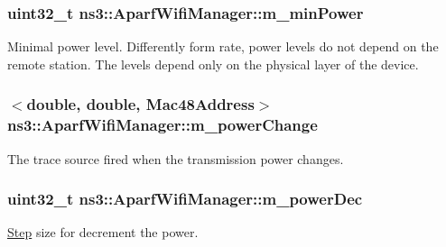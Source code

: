 \subsubsection[{\texorpdfstring{m\+\_\+min\+Power}{m_minPower}}]{\setlength{\rightskip}{0pt plus 5cm}uint32\+\_\+t ns3\+::\+Aparf\+Wifi\+Manager\+::m\+\_\+min\+Power\hspace{0.3cm}{\ttfamily [private]}}\hypertarget{classns3_1_1AparfWifiManager_a4cca2208e9b2c93a96b5e1442434451b}{}\label{classns3_1_1AparfWifiManager_a4cca2208e9b2c93a96b5e1442434451b}
Minimal power level. Differently form rate, power levels do not depend on the remote station. The levels depend only on the physical layer of the device. 
\subsubsection[{\texorpdfstring{m\+\_\+power\+Change}{m_powerChange}}]{$<$double, double, {\bf Mac48\+Address}$>$ ns3\+::\+Aparf\+Wifi\+Manager\+::m\+\_\+power\+Change\hspace{0.3cm}{\ttfamily [private]}}\hypertarget{classns3_1_1AparfWifiManager_aa08f36618a5a666a4bf9d58f25c7efc3}{}\label{classns3_1_1AparfWifiManager_aa08f36618a5a666a4bf9d58f25c7efc3}
The trace source fired when the transmission power changes. 
\subsubsection[{\texorpdfstring{m\+\_\+power\+Dec}{m_powerDec}}]{\setlength{\rightskip}{0pt plus 5cm}uint32\+\_\+t ns3\+::\+Aparf\+Wifi\+Manager\+::m\+\_\+power\+Dec\hspace{0.3cm}{\ttfamily [private]}}\hypertarget{classns3_1_1AparfWifiManager_a802d7ed4d81a0f749afd4033950e0c31}{}\label{classns3_1_1AparfWifiManager_a802d7ed4d81a0f749afd4033950e0c31}


\hyperlink{structStep}{Step} size for decrement the power. 

